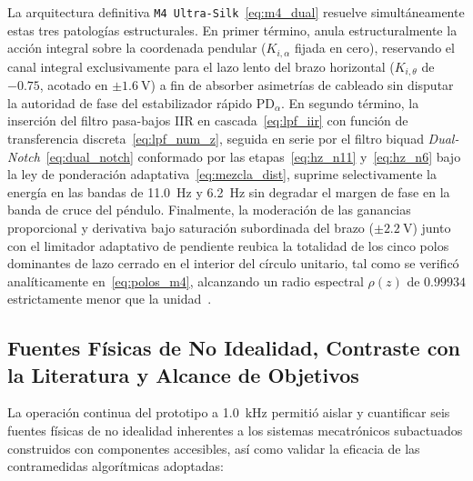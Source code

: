 La arquitectura definitiva \texttt{M4 Ultra-Silk}~\eqref{eq:m4_dual} resuelve simultáneamente estas tres patologías estructurales. En primer término, anula estructuralmente la acción integral sobre la coordenada pendular ($K_{i,\alpha}$ fijada en cero), reservando el canal integral exclusivamente para el lazo lento del brazo horizontal ($K_{i,\theta}$ de $-0.75$, acotado en $\pm\qty{1.6}{\volt}$) a fin de absorber asimetrías de cableado sin disputar la autoridad de fase del estabilizador rápido $\text{PD}_\alpha$. En segundo término, la inserción del filtro pasa-bajos IIR en cascada~\eqref{eq:lpf_iir} con función de transferencia discreta~\eqref{eq:lpf_num_z}, seguida en serie por el filtro biquad \textit{Dual-Notch}~\eqref{eq:dual_notch} conformado por las etapas~\eqref{eq:hz_n11} y~\eqref{eq:hz_n6} bajo la ley de ponderación adaptativa~\eqref{eq:mezcla_dist}, suprime selectivamente la energía en las bandas de \qty{11.0}{\hertz} y \qty{6.2}{\hertz} sin degradar el margen de fase en la banda de cruce del péndulo. Finalmente, la moderación de las ganancias proporcional y derivativa bajo saturación subordinada del brazo ($\pm\qty{2.2}{\volt}$) junto con el limitador adaptativo de pendiente reubica la totalidad de los cinco polos dominantes de lazo cerrado en el interior del círculo unitario, tal como se verificó analíticamente en~\eqref{eq:polos_m4}, alcanzando un radio espectral $\rho(z)$ de $0.99934$ estrictamente menor que la unidad~\cite{Ogata2010,Astrom1997,Franklin2015}.

\subsection{Fuentes Físicas de No Idealidad, Contraste con la Literatura y Alcance de Objetivos}\label{subsec:fuentes_no_idealidad}

La operación continua del prototipo a \qty{1.0}{\kilo\hertz} permitió aislar y cuantificar seis fuentes físicas de no idealidad inherentes a los sistemas mecatrónicos subactuados construidos con componentes accesibles, así como validar la eficacia de las contramedidas algorítmicas adoptadas:

